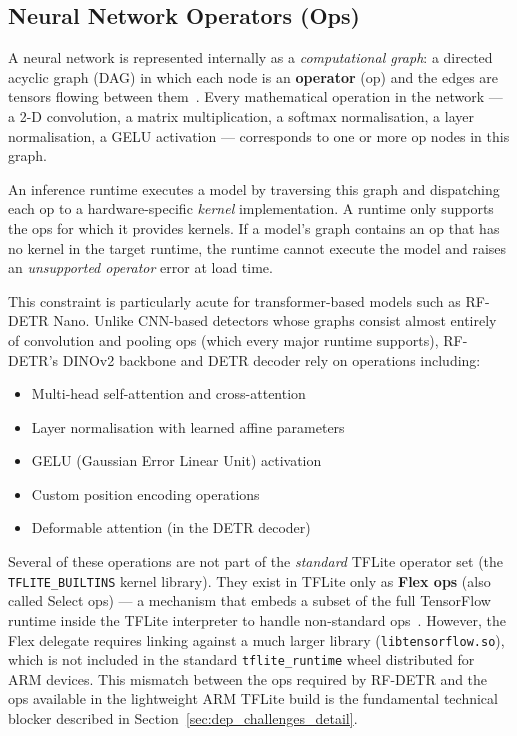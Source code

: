 \subsection{Neural Network Operators (Ops)}
\label{sec:ops}

A neural network is represented internally as a \emph{computational
graph}: a directed acyclic graph (DAG) in which each node is an
\textbf{operator} (op) and the edges are tensors flowing between
them~\cite{abadi2016tensorflow}. Every mathematical operation in the
network — a 2-D convolution, a matrix multiplication, a softmax
normalisation, a layer normalisation, a GELU activation — corresponds
to one or more op nodes in this graph.

An inference runtime executes a model by traversing this graph and
dispatching each op to a hardware-specific \emph{kernel}
implementation. A runtime only supports the ops for which it provides
kernels. If a model's graph contains an op that has no kernel in the
target runtime, the runtime cannot execute the model and raises an
\emph{unsupported operator} error at load time.

This constraint is particularly acute for transformer-based models
such as RF-DETR Nano. Unlike CNN-based detectors whose graphs consist
almost entirely of convolution and pooling ops (which every major
runtime supports), RF-DETR's DINOv2 backbone and DETR decoder rely on
operations including:

\begin{itemize}
    \item Multi-head self-attention and cross-attention
    \item Layer normalisation with learned affine parameters
    \item GELU (Gaussian Error Linear Unit) activation
    \item Custom position encoding operations
    \item Deformable attention (in the DETR decoder)
\end{itemize}

Several of these operations are not part of the \emph{standard}
TFLite operator set (the \texttt{TFLITE\_BUILTINS} kernel library).
They exist in TFLite only as \textbf{Flex ops} (also called Select
ops) — a mechanism that embeds a subset of the full TensorFlow runtime
inside the TFLite interpreter to handle non-standard
ops~\cite{david2021tensorflow}. However, the Flex delegate requires
linking against a much larger library (\texttt{libtensorflow.so}),
which is not included in the standard \texttt{tflite\_runtime} wheel
distributed for ARM devices. This mismatch between the ops required by
RF-DETR and the ops available in the lightweight ARM TFLite build is
the fundamental technical blocker described in
Section~\ref{sec:dep_challenges_detail}.

